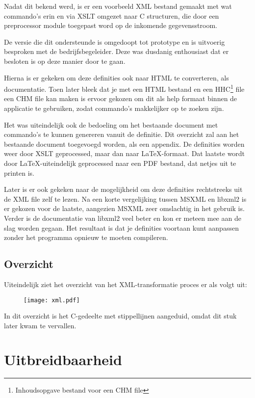 Nadat dit bekend werd, is er een voorbeeld XML bestand gemaakt met wat commando's erin en via XSLT omgezet naar C structuren, die door een preprocessor module toegepast word op de inkomende gegevensstroom.

De versie die dit ondersteunde is omgedoopt tot prototype en is uitvoerig besproken met de bedrijfsbegeleider. Deze was dusdanig enthousiast dat er besloten is op deze manier door te gaan.

Hierna is er gekeken om deze definities ook naar HTML te converteren, als documentatie. Toen later bleek dat je met een HTML bestand en een HHC\footnote{Inhoudsopgave bestand voor een CHM file} file een CHM file kan maken is ervoor gekozen om dit als help formaat binnen de applicatie te gebruiken, zodat commando's makkelijker op te zoeken zijn.

Het was uiteindelijk ook de bedoeling om het bestaande document met commando's te kunnen genereren vanuit de definitie. Dit overzicht zal aan het bestaande document toegevoegd worden, als een appendix. De definities worden weer door XSLT geprocessed, maar dan naar \LaTeX\mbox{-}formaat. Dat laatste wordt door \LaTeX\mbox{-}uiteindelijk geprocessed naar een PDF bestand, dat netjes uit te printen is.

Later is er ook gekeken naar de mogelijkheid om deze definities rechtstreeks uit de XML file zelf te lezen. Na een korte vergelijking tussen MSXML en libxml2 is er gekozen voor de laatste, aangezien MSXML zeer omslachtig in het gebruik is. Verder is de documentatie van libxml2 veel beter en kon er meteen mee aan de slag worden gegaan. Het resultaat is dat je definities voortaan kunt aanpassen zonder het programma opnieuw te moeten compileren.

\newpage
\subsection{Overzicht}

Uiteindelijk ziet het overzicht van het XML-transformatie proces er als volgt uit:

\begin{figure}[h]
\texttt{[image: xml.pdf]}
\end{figure}

In dit overzicht is het C-gedeelte met stippellijnen aangeduid, omdat dit stuk later kwam te vervallen.

\section{Uitbreidbaarheid}

